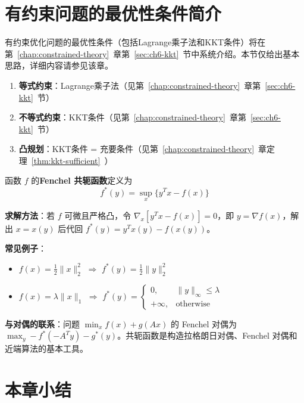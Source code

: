 \section{有约束问题的最优性条件简介}\label{sec:constrained-kkt}

有约束优化问题的最优性条件（包括Lagrange乘子法和KKT条件）将在第~\ref{chap:constrained-theory}~章第~\ref{sec:ch6-kkt}~节中系统介绍。本节仅给出基本思路，详细内容请参见该章。
\begin{conceptbox}[有约束问题的最优性条件概览]
\begin{enumerate}[label=\arabic*., leftmargin=2em]
    \item \textbf{等式约束}：Lagrange乘子法（见第~\ref{chap:constrained-theory}~章第~\ref{sec:ch6-kkt}~节）
    \item \textbf{不等式约束}：KKT条件（见第~\ref{chap:constrained-theory}~章第~\ref{sec:ch6-kkt}~节）
    \item \textbf{凸规划}：KKT条件 = 充要条件（见第~\ref{chap:constrained-theory}~章定理~\ref{thm:kkt-sufficient}~）\end{enumerate}
\end{conceptbox}

\begin{notebox}
函数 $f$ 的\textbf{Fenchel 共轭函数}定义为
\[
f^*(y) = \sup_x \{y^T x - f(x)\}
\]

\textbf{求解方法}：若 $f$ 可微且严格凸，令 $\nabla_x [y^T x - f(x)] = 0$，即 $y = \nabla f(x)$，解出 $x = x(y)$ 后代回 $f^*(y) = y^T x(y) - f(x(y))$。

\textbf{常见例子}：
\begin{itemize}[itemsep=0.2em]
    \item $f(x) = \frac{1}{2}\|x\|_2^2$ $\Rightarrow$ $f^*(y) = \frac{1}{2}\|y\|_2^2$
    \item $f(x) = \lambda\|x\|_1$ $\Rightarrow$ $f^*(y) = \begin{cases} 0, & \|y\|_\infty \leq \lambda \\ +\infty, & \text{otherwise} \end{cases}$
\end{itemize}

\textbf{与对偶的联系}：问题 $\min_x f(x) + g(Ax)$ 的 Fenchel 对偶为 $\max_y -f^*(-A^T y) - g^*(y)$。共轭函数是构造拉格朗日对偶、Fenchel 对偶和近端算法的基本工具。
\end{notebox}

\section{本章小结}\label{sec:ch3-summary}

